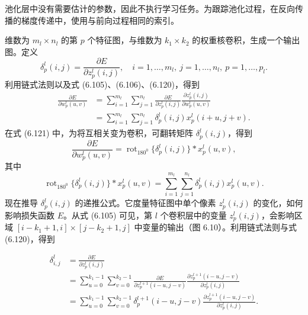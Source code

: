 
池化层中没有需要估计的参数，因此不执行学习任务。为跟踪池化过程，在反向传播的梯度传递中，使用与前向过程相同的索引。


维数为 $m_l\times n_l$ 的第 $p$ 个特征图，与维数为 $k_1\times k_2$ 的权重核卷积，生成一个输出图。定义
\begin{equation}
\delta_p^l(i,j)=\frac{\partial E}{\partial z_p^l(i,j)},\quad i=1,\ldots,m_l,\ j=1,\ldots,n_l,\ p=1,\ldots,p_l.
\tag{6.120}
\end{equation}
利用链式法则以及式 (6.105)、(6.106)、(6.120)，得到
\begin{equation}
\begin{aligned}
\frac{\partial E}{\partial w_p^l(u,v)}&=\sum_{i=1}^{m_l}\sum_{j=1}^{n_l}\frac{\partial E}{\partial z_p^l(i,j)}\frac{\partial z_p^l(i,j)}{\partial w_p^l(u,v)}\\
&=\sum_{i=1}^{m_l}\sum_{j=1}^{n_l}\delta_p^l(i,j)x_p^l(i+u,j+v).
\end{aligned}\tag{6.121}
\end{equation}
在式 (6.121) 中，为将互相关变为卷积，可翻转矩阵 $\delta_p^l(i,j)$，得到
\begin{equation}
\frac{\partial E}{\partial w_p^l(u,v)}=\operatorname{rot}_{180^0}\{\delta_p^l(i,j)\}*x_p^l(u,v),
\tag{6.122}
\end{equation}
其中
\[
\operatorname{rot}_{180^0}\{\delta_p^l(i,j)\}*x_p^l(u,v)=\sum_{i=1}^{m_l}\sum_{j=1}^{n_l}\delta_p^l(i,j)x_p^l(u,v).
\]
现在推导 $\delta_p^l(i,j)$ 的递推公式。它度量特征图中单个像素 $z_p^l(i,j)$ 的变化，如何影响损失函数 $E$。从式 (6.105) 可见，第 $l$ 个卷积层中的变量 $z_p^l(i,j)$，会影响区域 $[i-k_1+1,i]\times[j-k_2+1,j]$ 中变量的输出（图 6.10）。利用链式法则与式 (6.120)，得到

\begin{equation}
\begin{aligned}
\delta_{i,j}^l&=\frac{\partial E}{\partial z_p^l(i,j)}\\
&=\sum_{u=0}^{k_1-1}\sum_{v=0}^{k_2-1}\frac{\partial E}{\partial z_p^{l+1}(i-u,j-v)}\frac{\partial z_p^{l+1}(i-u,j-v)}{\partial z_p^l(i,j)}\\
&=\sum_{u=0}^{k_1-1}\sum_{v=0}^{k_2-1}\delta_p^{l+1}(i-u,j-v)\frac{\partial z_p^{l+1}(i-u,j-v)}{\partial z_p^l(i,j)}.
\end{aligned}\tag{6.123}
\end{equation}
